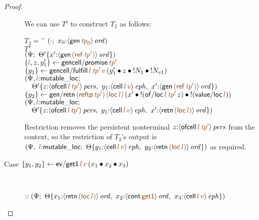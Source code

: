 \begin{proof}
\begin{description}
We can use $T'$ to construct $T_2$ as follows:
\begin{tabbing}
$T_2 = ~$ \= \qquad \= 
    $(\cdot; ~x_0{:}\istrue{\susp{{\sf gen}\,\lf{{\it tp}_0}}})$
\\
\>$T'$
\\
\>\>$(\Psi; ~
     \tackon{\Theta'}
     {x'{:}\istrue{\susp{{\sf gen}\,\lf{({\sf ref}\,{\it tp}')}}}})$
\\
\>$\trstep{\lf{l}, z, y_1'}{{\sf gencell/promise}\,\lf{{\it tp}'}}$
\\
\>$\trstep{y_1}{{\sf gencell/fulfill}\,\lf{l}\,\lf{{\it tp}'}\,\lf{v}\,
      (\tfuser{y_1'}{\tfuser{z}{\tfuser{\tbangr{N_1}}{\tbangr{N_{v1}}}}})}$
\\
\>\>$(\Psi, \lf{l}{:}{\sf mutable\_loc};$
\\
\>\>$\quad 
     \tackon{\Theta'}
     {z{:}\ispers{\susp{{\sf ofcell}\,\lf{l}\,\lf{{\it tp}'}}}, ~
      y_1{:}\iseph{\susp{{\sf cell}\,\lf{l}\,\lf{v}}}, ~
      x'{:}\istrue{\susp{{\sf gen}\,\lf{({\sf ref}\,{\it tp}')}}}})$
\\
\>$\trstep{y_2}
     {{\sf gen/retn}\,\lf{({\sf reftp}\,{\it tp}')}\,\lf{({\sf loc}\,l)}\,(\tfuser{x'}{\tfuser{\tbangr{({\sf of/loc}\,\lf{l}\,\lf{{\it tp}'}\,z)}}{\tbangr{({\sf value/loc}\,\lf{l})}}})}$
\\
\>\>$(\Psi, \lf{l}{:}{\sf mutable\_loc};$
\\
\>\>$\quad 
     \tackon{\Theta'}
     {z{:}\ispers{\susp{{\sf ofcell}\,\lf{l}\,\lf{{\it tp}'}}}, ~
      y_1{:}\iseph{\susp{{\sf cell}\,\lf{l}\,\lf{v}}}, ~
      x'{:}\istrue{\susp{{\sf retn}\,\lf{({\sf loc}\,l)}}}})$
\end{tabbing}

Restriction removes the persistent nonterminal $z{:}\ispers{\susp{{\sf
      ofcell}\,\lf{l}\,\lf{{\it tp}'}}}$ from the context, so the
restriction of $T_2$'s output is $\left(\Psi, ~ \lf{l}{:}{\sf mutable\_loc}; ~
   \tackon{\Theta}{y_1{:}\iseph{\susp{{\sf cell}\,\lf{l}\,\lf{v}}}, ~
                   y_2{:}\istrue{\susp{{\sf retn}\,\lf{({\sf loc}\,\lf{l})}}}}
   \right)$ as
required.

\medskip

\item
  [Case $\trstep{y_1, y_2}
         {{\sf ev/get1}\,\lf{l}\,\lf{v}\,(\tfuser{x_1}{\tfuser{x_2}{x_3}})}$]~

\qquad 
  $:: \left(\Psi; ~
   \tackon{\Theta}
    {x_1{:}\istrue{\susp{{\sf retn}\,\lf{({\sf loc}\,l)}}}, ~
     x_2{:}\istrue{\susp{{\sf cont}\,\lf{{\sf get1}}}}, ~
     x_3{:}\iseph{\susp{{\sf cell}\,\lf{l}\,\lf{v}}}
    }\right)$


\end{description}
\end{proof}

